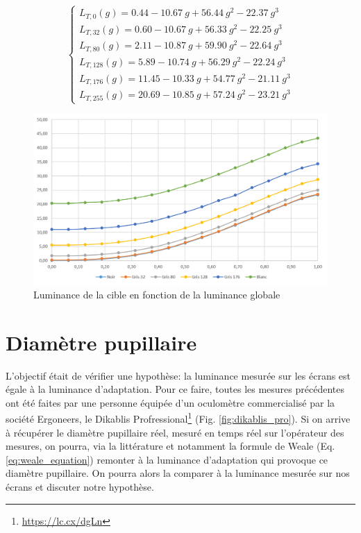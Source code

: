 	\begin{equation}
		\begin{cases}
		L_{T,0}(g) = 0.44 - 10.67~g + 56.44~g^2 - 22.37~g^3\\
		L_{T,32}(g) = 0.60 - 10.67~g + 56.33~g^2 - 22.25~g^3\\
		L_{T,80}(g) = 2.11 - 10.87~g + 59.90~g^2 - 22.64~g^3\\
		L_{T,128}(g) = 5.89 - 10.74~g + 56.29~g^2 - 22.24~g^3\\
		L_{T,176}(g) = 11.45 - 10.33~g + 54.77~g^2 - 21.11~g^3\\
		L_{T,255}(g) = 20.69 - 10.85~g + 57.24~g^2 - 23.21~g^3
		\end{cases}
		\label{eq:regression_luminance_cible}
	\end{equation}
	
	\begin{figure}
		\centering
		\includegraphics[scale=.75]{Figures/EvolutionLuminanceTarget}
		\caption{Luminance de la cible en fonction de la luminance globale}
		\label{fig:evolution_luminance_target}
	\end{figure}
	
	\section{Diamètre pupillaire}
	\par L'objectif était de vérifier une hypothèse: la luminance mesurée sur les écrans est égale à la luminance d'adaptation. Pour ce faire, toutes les mesures précédentes ont été faites par une personne équipée d'un oculomètre commercialisé par la société Ergoneers, le Dikablis Profressional\footnote{\url{https://lc.cx/dgLn}} (Fig. \ref{fig:dikablis_pro}). Si on arrive à récupérer le diamètre pupillaire réel, mesuré en temps réel sur l'opérateur des mesures, on pourra, via la littérature et notamment la formule de Weale (Eq. \ref{eq:weale_equation}) remonter à la luminance d'adaptation qui provoque ce diamètre pupillaire. On pourra alors la comparer à la luminance mesurée sur nos écrans et discuter notre hypothèse.
	
